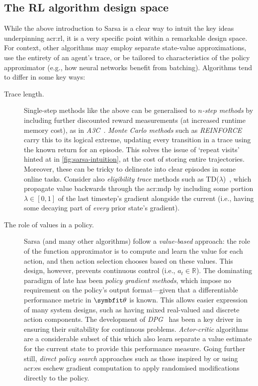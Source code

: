 \subsection{The RL algorithm design space}
While the above introduction to Sarsa is a clear way to intuit the key ideas underpinning \gls{acr:rl}, it is a very specific point within a remarkable design space.
For context, other algorithms may employ separate state-value approximations, use the entirety of an agent's trace, or be tailored to characteristics of the policy approximator (e.g., how neural networks benefit from batching).
Algorithms tend to differ in some key ways:

\begin{description}
	\item[Trace length.] Single-step methods like the above can be generalised to \emph{$n$-step methods} by including further discounted reward measurements (at increased runtime memory cost), as in \emph{A3C}~\parencite{DBLP:conf/icml/MnihBMGLHSK16}. \emph{Monte Carlo methods} such as \emph{REINFORCE}~\parencite{DBLP:journals/ml/Williams92} carry this to its logical extreme, updating every transition in a trace using the known return for an episode. This solves the issue of `repeat visits' hinted at in \cref{fig:sarsa-intuition}, at the cost of storing entire trajectories. Moreover, these can be tricky to delineate into clear episodes in some online tasks. Consider also \emph{eligibility trace} methods such as TD($\lambda$)~\parencite{DBLP:journals/cacm/Tesauro95}, which propagate value backwards through the \gls{acr:mdp} by including some portion $\lambda\in\left[0,1\right]$ of the last timestep's gradient alongside the current (i.e., having some decaying part of \emph{every} prior state's gradient).
	
	\item[The role of values in a policy.] Sarsa (and many other algorithms) follow a \emph{value-based} approach: the role of the function approximator is to compute and learn the value for each action, and then action selection chooses based on these values. This design, however, prevents continuous control (i.e., $a_t\in\mathbb{R}$). The dominating paradigm of late has been \emph{policy gradient methods}, which impose no requirement on the policy's output format---given that a differentiable performance metric in $\wvec{}$ is known. This allows easier expression of many system designs, such as having mixed real-valued and discrete action components. The development of \emph{DPG}~\parencite{DBLP:conf/icml/SilverLHDWR14} has been a key driver in ensuring their suitability for continuous problems. \emph{Actor-critic} algorithms are a considerable subset of this which also learn separate a value estimate for the current state to provide this performance measure. Going further still, \emph{direct policy search} approaches such as those inspired by or using \gls{acr:es} eschew gradient computation to apply randomised modifications directly to the policy.
\end{description}

